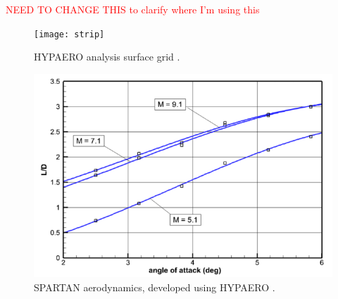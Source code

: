 \textcolor{red}{NEED TO CHANGE THIS to clarify where I'm using this}

\begin{figure}[ht]
	\centering
	\texttt{[image: strip]}
	\caption{HYPAERO analysis surface grid \cite{Jazra2013}.}
	\label{fig:strip}
\end{figure}

\begin{figure}
\centering
\includegraphics[width=0.7\linewidth]{figures/2_literature-review/HYPAERO-aero}
\caption{SPARTAN aerodynamics, developed using HYPAERO \cite{Preller2017}.}
\label{fig:HYPAERO-aero}
\end{figure}


